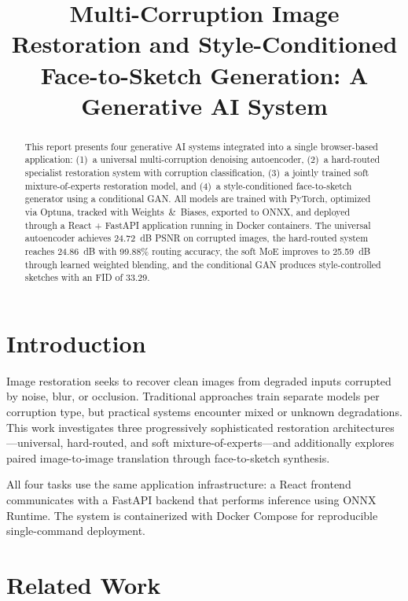 \documentclass[conference]{IEEEtran}
\title{Multi-Corruption Image Restoration and Style-Conditioned\\Face-to-Sketch Generation: A Generative AI System}
\author{\IEEEauthorblockN{Muhammad Umair}
\IEEEauthorblockA{Generative AI — Assignment 1\\
GitHub: \url{https://github.com/Umairishuman/Autoencoders-GANs.git}}}
\begin{document}
\maketitle

\begin{abstract}
This report presents four generative AI systems integrated into a single browser-based application: (1)~a universal multi-corruption denoising autoencoder, (2)~a hard-routed specialist restoration system with corruption classification, (3)~a jointly trained soft mixture-of-experts restoration model, and (4)~a style-conditioned face-to-sketch generator using a conditional GAN. All models are trained with PyTorch, optimized via Optuna, tracked with Weights~\&~Biases, exported to ONNX, and deployed through a React + FastAPI application running in Docker containers. The universal autoencoder achieves 24.72~dB PSNR on corrupted images, the hard-routed system reaches 24.86~dB with 99.88\% routing accuracy, the soft MoE improves to 25.59~dB through learned weighted blending, and the conditional GAN produces style-controlled sketches with an FID of 33.29.
\end{abstract}

\section{Introduction}

Image restoration seeks to recover clean images from degraded inputs corrupted by noise, blur, or occlusion. Traditional approaches train separate models per corruption type, but practical systems encounter mixed or unknown degradations. This work investigates three progressively sophisticated restoration architectures—universal, hard-routed, and soft mixture-of-experts—and additionally explores paired image-to-image translation through face-to-sketch synthesis.

All four tasks use the same application infrastructure: a React frontend communicates with a FastAPI backend that performs inference using ONNX Runtime. The system is containerized with Docker Compose for reproducible single-command deployment.

\section{Related Work}
\end{document}
